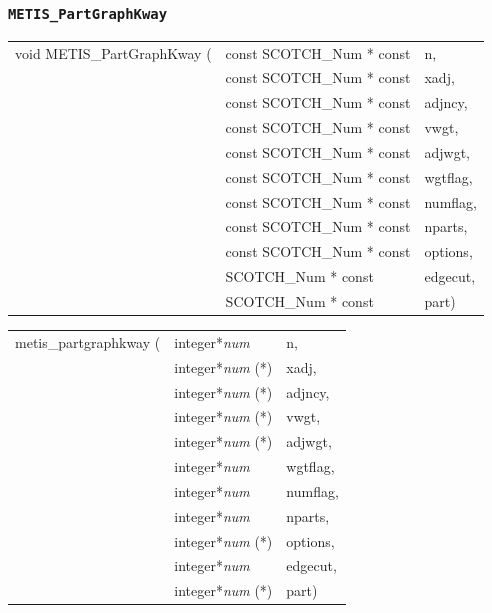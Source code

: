 \subsubsection{{\tt METIS\_PartGraphKway}}

\begin{itemize}
\progsyn

{\tt\begin{tabular}{l@{}ll}
void METIS\_PartGraphKway ( & const SCOTCH\_Num * const & n, \\
                            & const SCOTCH\_Num * const & xadj, \\
                            & const SCOTCH\_Num * const & adjncy, \\
                            & const SCOTCH\_Num * const & vwgt, \\
                            & const SCOTCH\_Num * const & adjwgt, \\
                            & const SCOTCH\_Num * const & wgtflag, \\
                            & const SCOTCH\_Num * const & numflag, \\
                            & const SCOTCH\_Num * const & nparts, \\
                            & const SCOTCH\_Num * const & options, \\
                            & SCOTCH\_Num * const       & edgecut, \\
                            & SCOTCH\_Num * const       & part)
\end{tabular}}

{\tt\begin{tabular}{l@{}ll}
metis\_partgraphkway ( & integer*{\it num}     & n, \\
                       & integer*{\it num} (*) & xadj, \\
                       & integer*{\it num} (*) & adjncy, \\
                       & integer*{\it num} (*) & vwgt, \\
                       & integer*{\it num} (*) & adjwgt, \\
                       & integer*{\it num}     & wgtflag, \\
                       & integer*{\it num}     & numflag, \\
                       & integer*{\it num}     & nparts, \\
                       & integer*{\it num} (*) & options, \\
                       & integer*{\it num}     & edgecut, \\
                       & integer*{\it num} (*) & part)
\end{tabular}}


\end{itemize}
